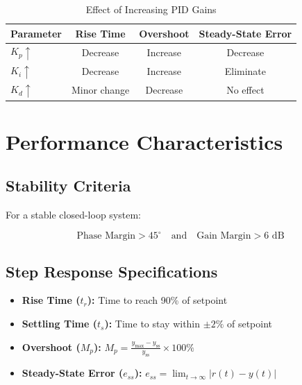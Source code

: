 \documentclass[11pt,a4paper]{article}
\begin{document}
\begin{table}[h]
\centering
\begin{tabular}{lccc}
\toprule
\textbf{Parameter} & \textbf{Rise Time} & \textbf{Overshoot} & \textbf{Steady-State Error} \\
\midrule
$K_p \uparrow$ & Decrease & Increase & Decrease \\
$K_i \uparrow$ & Decrease & Increase & Eliminate \\
$K_d \uparrow$ & Minor change & Decrease & No effect \\
\bottomrule
\end{tabular}
\caption{Effect of Increasing PID Gains}
\end{table}

\section{Performance Characteristics}

\subsection{Stability Criteria}

For a stable closed-loop system:

\begin{equation}
\text{Phase Margin} > 45^\circ \quad \text{and} \quad \text{Gain Margin} > 6 \text{ dB}
\end{equation}

\subsection{Step Response Specifications}

\begin{itemize}
  \item \textbf{Rise Time ($t_r$):} Time to reach 90\% of setpoint
  \item \textbf{Settling Time ($t_s$):} Time to stay within $\pm 2\%$ of setpoint
  \item \textbf{Overshoot ($M_p$):} $M_p = \frac{y_{\max} - y_{\text{ss}}}{y_{\text{ss}}} \times 100\%$
  \item \textbf{Steady-State Error ($e_{ss}$):} $e_{ss} = \lim_{t \to \infty} |r(t) - y(t)|$
\end{itemize}
\end{document}
